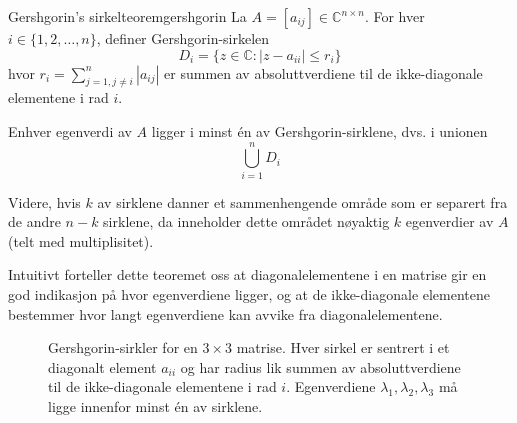 \begin{theorem}{Gershgorin's sirkelteorem}{gershgorin}
	La $A = [a_{ij}] \in \mathbb{C}^{n \times n}$. For hver $i \in \{1,2,\ldots,n\}$, definer Gershgorin-sirkelen
	\[
		D_i = \{z \in \mathbb{C} : |z - a_{ii}| \leq r_i\}
	\]
	hvor $r_i = \sum_{j=1,j\neq i}^{n} |a_{ij}|$ er summen av absoluttverdiene til de ikke-diagonale elementene i rad $i$.

	Enhver egenverdi av $A$ ligger i minst én av Gershgorin-sirklene, dvs. i unionen
	\[
		\bigcup_{i=1}^{n} D_i
	\]

	Videre, hvis $k$ av sirklene danner et sammenhengende område som er separert fra de andre $n-k$ sirklene, da inneholder dette området nøyaktig $k$ egenverdier av $A$ (telt med multiplisitet).
\end{theorem}

Intuitivt forteller dette teoremet oss at diagonalelementene i en matrise gir en god indikasjon på hvor egenverdiene ligger, og at de ikke-diagonale elementene bestemmer hvor langt egenverdiene kan avvike fra diagonalelementene.

\begin{figure}
	\centering
	\caption{Gershgorin-sirkler for en $3 \times 3$ matrise. Hver sirkel er sentrert i et diagonalt element $a_{ii}$ og har radius lik summen av absoluttverdiene til de ikke-diagonale elementene i rad $i$. Egenverdiene $\lambda_1, \lambda_2, \lambda_3$ må ligge innenfor minst én av sirklene.}
	\label{fig:gershgorin}
\end{figure}

